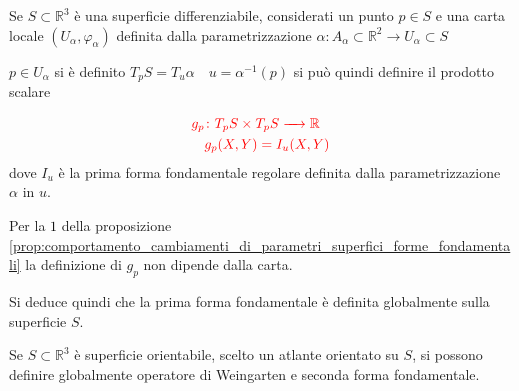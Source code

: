         \begin{osservazione}
        Se $S \subset \mathbb{R}^3$ è una superficie differenziabile, considerati un punto $p \in S$ e una carta locale
        $(U_\alpha, \varphi_\alpha)$ definita dalla parametrizzazione $\alpha \colon A_\alpha \subset \mathbb{R}^2 \to U_\alpha \subset S$

        $p \in U_\alpha$ si è definito $T_p S=T_u \alpha \quad u=\alpha^{-1}(p)$ si può quindi definire il prodotto scalare

        \[ \color{red} \begin{aligned}
        g_p &\colon T_p S \times T_p S \xrightarrow{\quad} \mathbb{R} \\
        &g_p (X,Y)=I_u (X,Y)
        \end{aligned} \]
        dove $I_u$ è la prima forma fondamentale regolare definita dalla parametrizzazione $\alpha$ in $u$.

        Per la \textcolor{black}{$1$} della proposizione \ref{prop:comportamento_cambiamenti_di_parametri_superfici_forme_fondamentali} la 
        definizione di $g_p$ non dipende dalla carta.

        Si deduce quindi che la prima forma fondamentale è definita globalmente sulla superficie $S$.

        Se $S \subset \mathbb{R}^3$ è superficie orientabile, scelto un atlante orientato su $S$, si possono
        definire globalmente operatore di Weingarten e seconda forma fondamentale.
        \end{osservazione}
